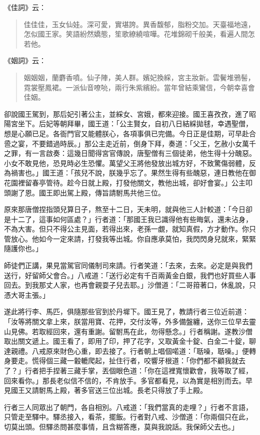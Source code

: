 《佳詞》云：
\begin{quote}
佳佳佳，玉女仙娃。深可愛，實堪誇。異香馥郁，脂粉交加。天臺福地遠，怎似國王家。笑語紛然嬌態，笙歌繚繞喧嘩。花堆錦砌千般美，看遍人間怎若他。
\end{quote}

《姻詞》云：
\begin{quote}
姻姻姻，蘭麝香噴。仙子陣，美人群。嬪妃換綵，宮主妝新。雲鬢堆鴉髻，霓裳壓鳳裙。一派仙音嘹喨，兩行朱紫繽紛。當年曾結乘鸞信，今朝幸喜會佳姻。
\end{quote}

卻說國王駕到，那后妃引著公主，並綵女、宮娥，都來迎接。國王喜孜孜，進了昭陽宮坐下。后妃等朝拜畢，國王道：「公主賢女，自初八日結綵拋毬，幸遇聖僧，想是心願已足。各衙門官又能體朕心，各項事俱已完備。今日正是佳期，可早赴合巹之宴，不要錯過時辰。」那公主走近前，倒身下拜，奏道：「父王，乞赦小女萬千之罪，有一言啟奏：這幾日聞得宮官傳說，唐聖僧有三個徒弟，他生得十分醜惡。小女不敢見他，恐見時必生恐懼。萬望父王將他發放出城方好，不致驚傷弱體，反為禍害也。」國王道：「孩兒不說，朕幾乎忘了。果然生得有些醜惡，連日教他在御花園裡留春亭管待。趁今日就上殿，打發他關文，教他出城，卻好會宴。」公主叩頭謝了恩。國王即出駕上殿，傳旨請駙馬共他三位。

原來那唐僧捏指頭兒算日子，熬至十二日，天未明，就與他三人計較道：「今日卻是十二了，這事如何區處？」行者道：「那國王我已識得他有些晦氣，還未沾身，不為大害。但只不得公主見面，若得出來，老孫一覷，就知真假，方才動作。你只管放心。他如今一定來請，打發我等出城。你自應承莫怕，我閃閃身兒就來，緊緊隨護你也。」

師徒們正講，果見當駕官同儀制司來請。行者笑道：「去來，去來。必定是與我們送行，好留師父會合。」八戒道：「送行必定有千百兩黃金白銀，我們也好買些人事回去。到我那丈人家，也再會親耍子兒去耶。」沙僧道：「二哥箝著口，休亂說，只憑大哥主張。」

遂此將行李、馬匹，俱隨那些官到於丹墀下。國王見了，教請行者三位近前道：「汝等將關文拿上來，朕當用寶、花押，交付汝等，外多備盤纏，送你三位早去靈山見佛。若取經回來，還有重謝。留駙馬在此，勿得懸念。」行者稱謝。遂教沙僧取出關文遞上。國王看了，即用了印，押了花字，又取黃金十錠、白金二十錠，聊達親禮。八戒原來財色心重，即去接了。行者朝上唱個喏道：「聒噪，聒噪。」便轉身要走。慌得個三藏一轂轆爬起，扯住行者，咬響牙根道：「你們都不顧我就去了？」行者把手捏著三藏手掌，丟個眼色道：「你在這裡寬懷歡會，我等取了經，回來看你。」那長老似信不信的，不肯放手。多官都看見，以為實是相別而去。早見國王又請駙馬上殿，著多官送三位出城。長老只得放了手上殿。

行者三人同眾出了朝門，各自相別。八戒道：「我們當真的走哩？」行者不言語，只管走至驛中。驛丞接入，看茶，擺飯。行者對八戒、沙僧道：「你兩個只在此，切莫出頭。但驛丞問甚麼事情，且含糊答應，莫與我說話。我保師父去也。」

